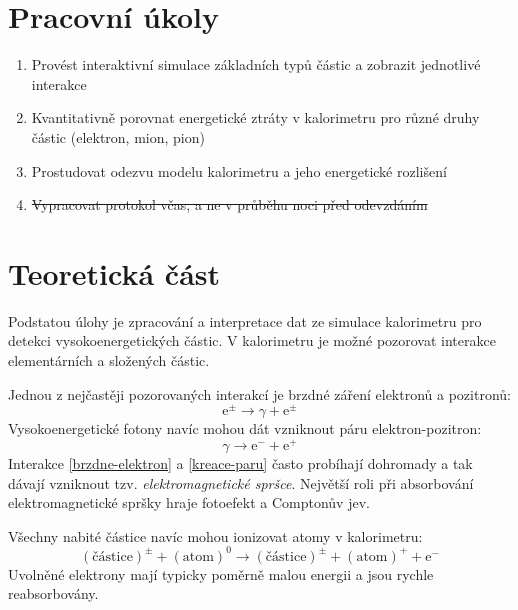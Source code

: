 \documentclass[10pt,a4paper]{article}
\newcommand{\°}{\degree}
\renewcommand{\t}[1]{\mathrm{#1}}
\begin{document}

\setmainfont{Linux Libertine O}




\section{Pracovní úkoly}
\begin{enumerate}
    \item Provést interaktivní simulace základních typů částic a zobrazit jednotlivé interakce
    \item Kvantitativně porovnat energetické ztráty v kalorimetru pro různé druhy částic (elektron, mion, pion)
    \item Prostudovat odezvu modelu kalorimetru a jeho energetické rozlišení
    \item \st{Vypracovat protokol včas, a ne v průběhu noci před odevzdáním}
\end{enumerate}

\section{Teoretická část}
Podstatou úlohy je zpracování a interpretace dat ze simulace kalorimetru pro detekci vysokoenergetických částic. V kalorimetru je možné pozorovat interakce elementárních a složených částic.

Jednou z nejčastěji pozorovaných interakcí je brzdné záření elektronů a pozitronů:
\begin{equation}
    \t e^\pm \to \gamma + \t e^\pm
    \label{brzdne-elektron}
\end{equation}
Vysokoenergetické fotony navíc mohou dát vzniknout páru elektron-pozitron:
\begin{equation}
    \gamma \to \t e^- + \t e^+
    \label{kreace-paru}
\end{equation}
Interakce \eqref{brzdne-elektron} a \eqref{kreace-paru} často probíhají dohromady a tak dávají vzniknout tzv. \textit{elektromagnetické spršce}. Největší roli při absorbování elektromagnetické spršky hraje fotoefekt a Comptonův jev.

Všechny nabité částice navíc mohou ionizovat atomy v kalorimetru:
\begin{equation}
    (\t{částice})^\pm + (\t{atom})^0 \to
    (\t{částice})^\pm + (\t{atom})^+ + \t e^-
    \label{ionizace}
\end{equation}
Uvolněné elektrony mají typicky poměrně malou energii a jsou rychle reabsorbovány.
\end{document}
